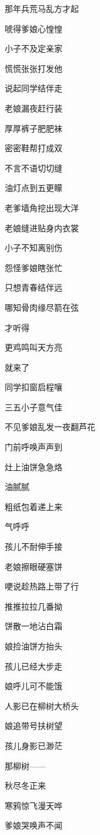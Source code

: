 \par 
\par 那年兵荒马乱方才起
\par 唬得爹娘心惶惶
\par 小子不及定亲家
\par 慌慌张张打发他
\par 说起同学结伴走
\par 老娘漏夜赶行装
\par 厚厚裤子肥肥袜
\par 密密鞋帮打成双
\par 不言不语切切缝
\par 油灯点到五更矇
\par 老爹墙角挖出现大洋
\par 老娘缝进贴身内衣裳
\par 
\par 小子不知离别伤
\par 怨怪爹娘瞎张忙
\par 只想青春结伴远
\par 哪知骨肉缘尽箭在弦
\par 才听得
\par 更鸡鸣叫天方亮
\par 就来了
\par 同学扣窗启程嚷
\par 三五小子意气佳
\par 不见爹娘乱发一夜翻芦花
\par 
\par 门前呼唤声声到
\par 灶上油饼急急烙
\par 油腻腻
\par 粗纸包着递上来
\par 气呼呼
\par 孩儿不耐伸手接
\par 老娘擦眼硬塞饼
\par 哽说趁热路上带了行
\par 推推拉拉几番拗
\par 饼散一地沾白霜
\par 娘捡油饼方抬头
\par 孩儿已经大步走
\par 娘呼儿可不能饿
\par 人影已在柳树大桥头
\par 娘追带号扶树望
\par 孩儿身影已渺茫
\par 那柳树——
\par 秋尽冬正来
\par 寒鸦惊飞漫天哗
\par 爹娘哭唤声不闻
